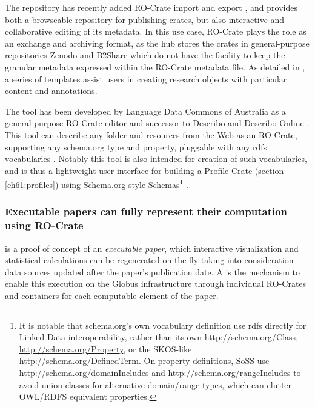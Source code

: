 The repository  \cite{ch5-48} has recently added RO-Crate import and export \cite{Fouilloux 2023}, and provides both a browseable repository for publishing crates, but also interactive and collaborative editing of its metadata. 
In this use case, RO-Crate plays the role as an exchange and archiving format, as the hub stores the crates in general-purpose repositories Zenodo and B2Share which do not have the facility to keep the granular metadata expressed within the RO-Crate metadata file. As detailed in \cite{Fouilloux 2023}, a series of templates assist users in creating research objects with particular content and annotations. 

The  tool has been developed by Language Data Commons of Australia  as a general-purpose RO-Crate editor and successor to Describo \cite{ch5-78} and Describo Online \cite{ch5-77}. 
This tool can describe any folder and resources from the Web as an RO-Crate, supporting any schema.org type and property, pluggable with any rdfs vocabularies \cite{w3-rdf-schema}. 
Notably this tool is also intended for creation of such vocabularies, and is thus a lightweight user interface for building a Profile Crate (section \vref{ch61:profiles}) using Schema.org style Schemas\footnote{
  It is notable that schema.org's own vocabulary definition use rdfs directly for Linked Data interoperability, 
  rather than its own \url{http://schema.org/Class}, \url{http://schema.org/Property}, or the SKOS-like \url{http://schema.org/DefinedTerm}. 
  On property definitions, SoSS use \url{http://schema.org/domainIncludes} and \url{http://schema.org/rangeIncludes} to avoid union classes for alternative domain/range types, which can clutter OWL/RDFS equivalent properties.} 
.


\subsubsection{Executable papers can fully represent their computation using RO-Crate}
\label{ch61:livepublication}

 \cite{Ellerm 2023} is a proof of concept of an \emph{executable paper}, which interactive visualization and statistical calculations can be regenerated on the fly taking into consideration data sources updated after the paper's publication date. A  is the mechanism to enable this execution on the Globus infrastructure through individual RO-Crates and containers for each computable element of the paper.

